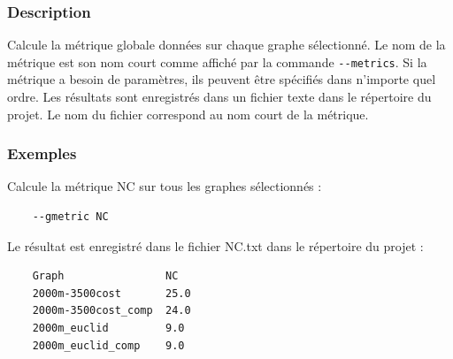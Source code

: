 \documentclass[a4paper,10pt]{report}
\begin{document}
\subsubsection{Description}
Calcule la métrique globale données sur chaque graphe sélectionné.
Le nom de la métrique est son nom court comme affiché par la commande \verb|--metrics|.
Si la métrique a besoin de paramètres, ils peuvent être spécifiés dans n'importe quel ordre.
Les résultats sont enregistrés dans un fichier texte dans le répertoire du projet. Le nom du fichier correspond au nom court de la métrique.

\subsubsection{Exemples}
Calcule la métrique NC sur tous les graphes sélectionnés :
\begin{Verbatim}
	--gmetric NC
\end{Verbatim}
Le résultat est enregistré dans le fichier NC.txt dans le répertoire du projet :
\begin{Verbatim}
	Graph                NC
	2000m-3500cost       25.0
	2000m-3500cost_comp  24.0
	2000m_euclid         9.0
	2000m_euclid_comp    9.0
\end{Verbatim}
\end{document}
